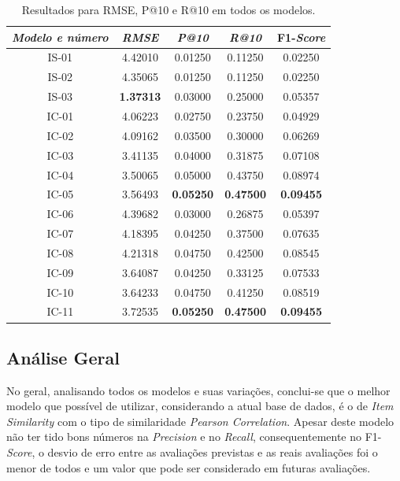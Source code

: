 \begin{table}[H]
    \centering
    \caption{Resultados para RMSE, P@10 e R@10 em todos os modelos.}
    \label{tab:all_results}
    \begin{tabular}{|c|c|c|c|c|}
        \hline
        \textit{Modelo e número} &
        \textit{RMSE} & 
        \textit{P@10} & \textit{R@10} & F1-\textit{Score}\\ \hline
        IS-01 & 4.42010 & 0.01250 & 0.11250 & 0.02250 \\ \hline
        IS-02 & 4.35065 & 0.01250 & 0.11250 & 0.02250 \\ \hline
        IS-03 & \textbf{1.37313} & 0.03000 & 0.25000 & 0.05357 \\ \hline
        IC-01 & 4.06223 & 0.02750 & 0.23750 & 0.04929 \\ \hline
        IC-02 & 4.09162 & 0.03500 & 0.30000 & 0.06269 \\ \hline
        IC-03 & 3.41135 & 0.04000 & 0.31875 & 0.07108 \\ \hline
        IC-04 & 3.50065 & 0.05000 & 0.43750 & 0.08974 \\ \hline
        IC-05 & 3.56493 & \textbf{0.05250} & \textbf{0.47500} & \textbf{0.09455} \\ \hline
        IC-06 & 4.39682 & 0.03000 & 0.26875 & 0.05397 \\ \hline
        IC-07 & 4.18395 & 0.04250 & 0.37500 & 0.07635 \\ \hline
        IC-08 & 4.21318 & 0.04750 & 0.42500 & 0.08545 \\ \hline
        IC-09 & 3.64087 & 0.04250 & 0.33125 & 0.07533 \\ \hline
        IC-10 & 3.64233 & 0.04750 & 0.41250 & 0.08519 \\ \hline
        IC-11 & 3.72535 & \textbf{0.05250} & \textbf{0.47500} & \textbf{0.09455} \\ \hline
    \end{tabular}
\end{table}

\subsection{Análise Geral}

No geral, analisando todos os modelos e suas variações, conclui-se que o melhor modelo que possível de utilizar, considerando a atual base de dados, é o de \textit{Item Similarity} com o tipo de similaridade \textit{Pearson Correlation}. Apesar deste modelo não ter tido bons números na \textit{Precision} e no \textit{Recall}, consequentemente no F1-\textit{Score}, o desvio de erro entre as avaliações previstas e as reais avaliações foi o menor de todos e um valor que pode ser considerado em futuras avaliações.


